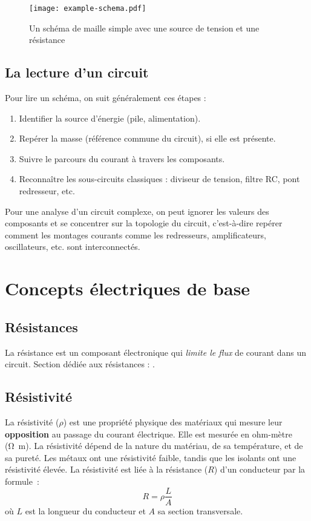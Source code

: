 \begin{figure}[H]
    \texttt{[image: example-schema.pdf]}
    \caption{
        Un sch\'ema de maille simple avec une source de tension et une r\'esistance
    }
\end{figure}

\subsection{La lecture d’un circuit}

\begin{Note}
Pour lire un sch\'ema, on suit g\'en\'eralement ces \'etapes :
\begin{enumerate}
  \item Identifier la source d’\'energie (pile, alimentation).
  \item Rep\'erer la masse (r\'ef\'erence commune du circuit), si elle est pr\'esente.
  \item Suivre le parcours du courant à travers les composants.
  \item Reconna\^itre les sous-circuits classiques : diviseur de tension, filtre RC, pont redresseur, etc.
\end{enumerate}

Pour une analyse d'un circuit complexe, on peut ignorer les valeurs des composants et se concentrer sur la topologie du circuit,
c'est-à-dire rep\'erer comment les montages courants comme les redresseurs, amplificateurs, oscillateurs, etc. sont interconnect\'es.
\end{Note}

\section{Concepts \'electriques de base}
\subsection{R\'esistances}
La r\'esistance est un composant \'electronique qui \emph{limite le flux} de courant dans un circuit. Section d\'edi\'ee aux r\'esistances : .

\subsection{R\'esistivit\'e}
La r\'esistivit\'e (\(\rho\)) est une propri\'et\'e physique des mat\'eriaux qui mesure leur \textbf{opposition} au passage du courant \'electrique. Elle est mesur\'ee en ohm-m\`etre (\unit{\ohm\meter}). La r\'esistivit\'e d\'epend de la nature du mat\'eriau, de sa temp\'erature, et de sa puret\'e. Les m\'etaux ont une r\'esistivit\'e faible, tandis que les isolants ont une r\'esistivit\'e \'elev\'ee. La r\'esistivit\'e est li\'ee à la r\'esistance (\(R\)) d’un conducteur par la formule~:
\[ R = \rho \dfrac{L}{A} \]
o\`u \(L\) est la longueur du conducteur et \(A\) sa section transversale.

